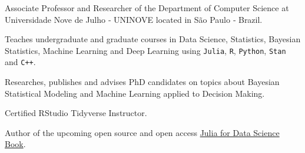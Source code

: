 \vspace{0.25cm}

\begin{cvitems}

  \item Associate Professor and Researcher of the Department of Computer Science at Universidade Nove de Julho ‑
  UNINOVE located in São Paulo ‑ Brazil.
  \item Teaches undergraduate and graduate courses in Data Science, Statistics, Bayesian Statistics,
  Machine Learning and Deep Learning using \texttt{Julia}, \texttt{R}, \texttt{Python}, \texttt{Stan} and \texttt{C++}.
  \item Researches, publishes and advises PhD candidates on topics about Bayesian Statistical Modeling and Machine
  Learning applied to Decision Making.
  \item Certified RStudio Tidyverse Instructor.
  \item Author of the upcoming open source and open access \href{https://juliadatascience.io}{Julia for Data Science Book}.

\end{cvitems}
